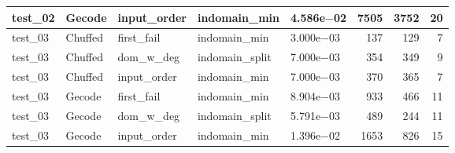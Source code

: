 \begin{compactfloats}
\begin{table}[H]
\begin{tabular}{l l l l l r r r}
    test\_02 & Gecode  & input\_order & indomain\_min   & 4.586e$-$02 & 7505 & 3752 & 20 \\
    \midrule
    test\_03 & Chuffed & first\_fail  & indomain\_min   & 3.000e$-$03 & 137  & 129  & 7 \\
    test\_03 & Chuffed & dom\_w\_deg  & indomain\_split & 7.000e$-$03 & 354  & 349  & 9 \\
    test\_03 & Chuffed & input\_order & indomain\_min   & 7.000e$-$03 & 370  & 365  & 7 \\
    test\_03 & Gecode  & first\_fail  & indomain\_min   & 8.904e$-$03 & 933  & 466  & 11 \\
    test\_03 & Gecode  & dom\_w\_deg  & indomain\_split & 5.791e$-$03 & 489  & 244  & 11 \\
    test\_03 & Gecode  & input\_order & indomain\_min   & 1.396e$-$02 & 1653 & 826  & 15 \\
    \bottomrule
  \end{tabular}
\end{table}


\end{compactfloats}

